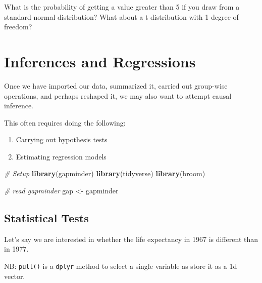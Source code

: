 \documentclass[
]{book}
\newenvironment{Shaded}{\begin{snugshade}}{\end{snugshade}}
\newcommand{\CommentTok}[1]{\textcolor[rgb]{0.56,0.35,0.01}{\textit{#1}}}
\newcommand{\DecValTok}[1]{\textcolor[rgb]{0.00,0.00,0.81}{#1}}
\newcommand{\KeywordTok}[1]{\textcolor[rgb]{0.13,0.29,0.53}{\textbf{#1}}}
\newcommand{\NormalTok}[1]{#1}
\newcommand{\OperatorTok}[1]{\textcolor[rgb]{0.81,0.36,0.00}{\textbf{#1}}}
\newcommand{\StringTok}[1]{\textcolor[rgb]{0.31,0.60,0.02}{#1}}
\providecommand{\tightlist}{%
  \setlength{\itemsep}{0pt}\setlength{\parskip}{0pt}}
\begin{document}
What is the probability of getting a value greater than 5 if you draw from a standard normal distribution? What about a t distribution with 1 degree of freedom?

\hypertarget{inferences-and-regressions}{%
\section{Inferences and Regressions}\label{inferences-and-regressions}}

Once we have imported our data, summarized it, carried out group-wise operations, and perhaps reshaped it, we may also want to attempt causal inference.

This often requires doing the following:

\begin{enumerate}
\def\labelenumi{\arabic{enumi})}
\tightlist
\item
  Carrying out hypothesis tests
\item
  Estimating regression models
\end{enumerate}

\begin{Shaded}
\begin{Highlighting}[]
\CommentTok{# Setup}
\KeywordTok{library}\NormalTok{(gapminder)}
\KeywordTok{library}\NormalTok{(tidyverse)}
\KeywordTok{library}\NormalTok{(broom)}

\CommentTok{# read gapminder}
\NormalTok{gap <-}\StringTok{ }\NormalTok{gapminder}
\end{Highlighting}
\end{Shaded}

\hypertarget{statistical-tests}{%
\subsection{Statistical Tests}\label{statistical-tests}}

Let's say we are interested in whether the life expectancy in 1967 is different than in 1977.

NB: \texttt{pull()} is a \texttt{dplyr} method to select a single variable as store it as a 1d vector.

\begin{Shaded}
\end{Shaded}
\end{document}
